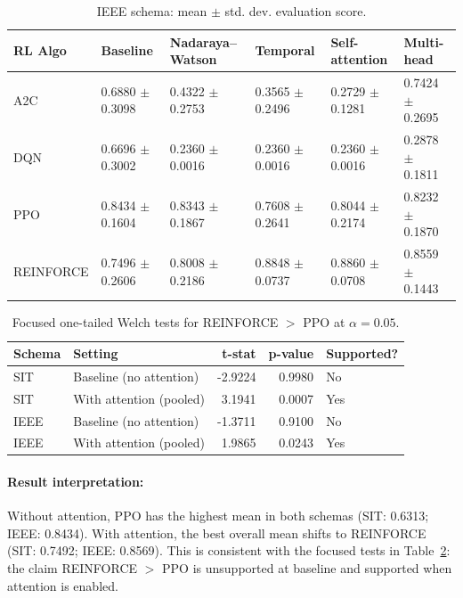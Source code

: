 \begin{table}[htbp]
	\centering
	\caption{IEEE schema: mean $\pm$ std. dev. evaluation score.}
	\label{tab:ieee_main_results}
	\begin{tabular}{l l l l l l}
	\toprule
	\textbf{RL Algo} & \textbf{Baseline} & \textbf{Nadaraya--Watson} & \textbf{Temporal} & \textbf{Self-attention} & \textbf{Multi-head}\\
	\midrule
	A2C & 0.6880 $\pm$ 0.3098 & 0.4322 $\pm$ 0.2753 & 0.3565 $\pm$ 0.2496 & 0.2729 $\pm$ 0.1281 & 0.7424 $\pm$ 0.2695\\
	DQN & 0.6696 $\pm$ 0.3002 & 0.2360 $\pm$ 0.0016 & 0.2360 $\pm$ 0.0016 & 0.2360 $\pm$ 0.0016 & 0.2878 $\pm$ 0.1811\\
	PPO & 0.8434 $\pm$ 0.1604 & 0.8343 $\pm$ 0.1867 & 0.7608 $\pm$ 0.2641 & 0.8044 $\pm$ 0.2174 & 0.8232 $\pm$ 0.1870\\
	REINFORCE & 0.7496 $\pm$ 0.2606 & 0.8008 $\pm$ 0.2186 & 0.8848 $\pm$ 0.0737 & 0.8860 $\pm$ 0.0708 & 0.8559 $\pm$ 0.1443\\
	\bottomrule
	\end{tabular}
\end{table}

\begin{table}[htbp]
	\centering
	\caption{Focused one-tailed Welch tests for \textsc{REINFORCE} $>$ \textsc{PPO} at $\alpha=0.05$.}
	\label{tab:rf_vs_ppo_tests}
	\begin{tabular}{l l r r l}
	\toprule
	\textbf{Schema} & \textbf{Setting} & \textbf{t-stat} & \textbf{p-value} & \textbf{Supported?}\\
	\midrule
	SIT & Baseline (no attention) & -2.9224 & 0.9980 & No\\
	SIT & With attention (pooled) & 3.1941 & 0.0007 & Yes\\
	IEEE & Baseline (no attention) & -1.3711 & 0.9100 & No\\
	IEEE & With attention (pooled) & 1.9865 & 0.0243 & Yes\\
	\bottomrule
	\end{tabular}
\end{table}

\paragraph{Result interpretation:}
Without attention, \textsc{PPO} has the highest mean in both schemas (SIT: 0.6313; IEEE: 0.8434). With attention, the best overall mean shifts to \textsc{REINFORCE} (SIT: 0.7492; IEEE: 0.8569). This is consistent with the focused tests in Table~\ref{tab:rf_vs_ppo_tests}: the claim \textsc{REINFORCE} $>$ \textsc{PPO} is unsupported at baseline and supported when attention is enabled.

